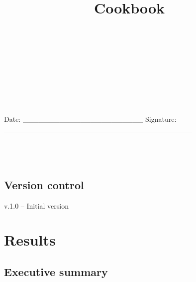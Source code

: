 \documentclass[]{elsarticle} %
\begin{document}
\begin{frontmatter}

  \title{Cookbook}
    \author[]{%
  }
  
  
  \begin{abstract}
  
  \end{abstract}
  
 \end{frontmatter}

\(~\)\\
\(~\)\\
\(~\)\\
\(~\)\\
\(~\)\\
\(~\)\\
\(~\)\\
Date: \_\_\_\_\_\_\_\_\_\_\_\_\_\_\_\_\_\_\_\_\_\_\_ Signature:
\_\_\_\_\_\_\_\_\_\_\_\_\_\_\_\_\_\_\_\_\_\_\_\_\_\_\_\_\_\_\_\_\_\_\_\_
\(~\)\\
\(~\)\\
\(~\)\\
\(~\)\\

\hypertarget{version-control}{%
\subsection*{Version control}\label{version-control}}

v.1.0 -- Initial version

\newpage

\listoffigures
\listoftables
\pagebreak

\hypertarget{results}{%
\section{Results}\label{results}}

\renewcommand\floatpagefraction{0.8}

\graphicspath{ {../figure} {../inst/cookbook_files/figure-latex/} {../figure-latex/} {../inst/01_chap1_files/figure-latex/}}

\hypertarget{executive-summary}{%
\subsection{Executive summary}\label{executive-summary}}
\end{document}
